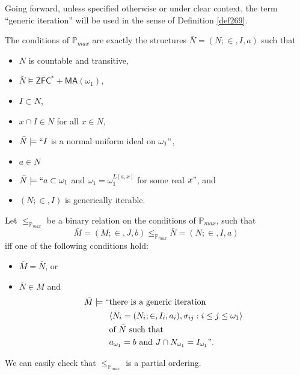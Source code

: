 \documentclass[12pt]{article}
\numberwithin{equation}{section}
\begin{document}
Going forward, unless specified otherwise or under clear context, the term ``generic iteration'' will be used in the sense of Definition \ref{def269}.

\begin{defi}\label{pmax}
The conditions of $\mathbb{P}_{max}$ are exactly the structures $\bar{N} = (N; \in, I, a)$ such that
\begin{itemize}
    \item $N$ is countable and transitive,
    \item $\bar{N} \models \mathsf{ZFC}^* + \mathsf{MA}(\omega_1)$,
    \item $I \subset N$,
    \item $x \cap I \in N$ for all $x \in N$,
    \item $\bar{N} \models ``I$ is a normal uniform ideal on $\omega_1"$, 
    \item $a \in N$
    \item $\bar{N} \models ``a \subset \omega_1$ and $\omega_1 = \omega_1^{L[a, x]}$ for some real $x"$, and
    \item $(N; \in, I)$ is generically iterable.
\end{itemize}
Let $\leq_{\mathbb{P}_{max}}$ be a binary relation on the conditions of $\mathbb{P}_{max}$, such that $$\bar{M} = (M; \in, J, b) \leq_{\mathbb{P}_{max}} \bar{N} = (N; \in, I, a)$$ iff one of the following conditions hold:
\begin{itemize}
    \item $\bar{M} = \bar{N}$, or 
    \item $\bar{N} \in M$ and
    \begin{align*}
        \bar{M} \models `` & \text{there is a generic iteration } \\ 
        & \langle \bar{N}_i = (N_i; \in, I_i, a_i), \sigma_{ij} : i \leq j \leq \omega_1 \rangle \\
        & \text{of } \bar{N} \text{ such that} \\
        & a_{\omega_1} = b \text{ and } J \cap N_{\omega_1} = I_{\omega_1}".
    \end{align*}
\end{itemize}
We can easily check that $\leq_{\mathbb{P}_{max}}$ is a partial ordering.
\end{defi}
\end{document}
